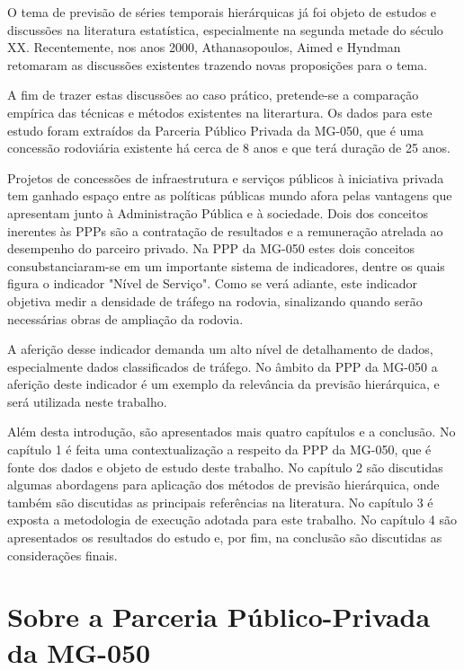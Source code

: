 \documentclass[
	12pt,				%
	openright,			%
	twoside,			%
	a4paper,			%
	english,			%
	french,				%
	spanish,			%
	brazil				%
	]{abntex2}
\begin{document}
O tema de previsão de séries temporais hierárquicas já foi objeto de estudos e discussões na literatura estatística, especialmente na segunda metade do século XX. Recentemente, nos anos 2000,  Athanasopoulos, Aimed e Hyndman retomaram as discussões existentes trazendo novas proposições para o tema. 

A fim de trazer estas discussões ao caso prático, pretende-se a comparação empírica das técnicas e métodos existentes na literartura. Os dados para este estudo foram extraídos da Parceria Público Privada da MG-050, que é uma concessão rodoviária existente há cerca de 8 anos e que terá duração de 25 anos.

Projetos de concessões de infraestrutura e serviços públicos à iniciativa privada tem ganhado espaço entre as políticas públicas mundo afora pelas vantagens que apresentam junto à Administração Pública e à sociedade. Dois dos conceitos inerentes às PPPs são a contratação de resultados e a remuneração atrelada ao desempenho do parceiro privado. Na PPP da MG-050 estes dois conceitos consubstanciaram-se em um importante sistema de indicadores, dentre os quais figura o indicador "Nível de Serviço". Como se verá adiante, este indicador objetiva medir a densidade de tráfego na rodovia, sinalizando quando serão necessárias  obras de ampliação da rodovia. 

A aferição desse indicador demanda um alto nível de detalhamento de dados, especialmente dados classificados de tráfego. No âmbito da PPP da MG-050 a aferição deste indicador é um exemplo da relevância da previsão hierárquica, e será utilizada neste trabalho.

Além desta introdução, são apresentados mais quatro capítulos e a conclusão. No capítulo 1 é feita uma contextualização a respeito da PPP da MG-050, que é fonte dos dados e objeto de estudo deste trabalho. No capítulo 2 são discutidas algumas abordagens para aplicação dos métodos de previsão hierárquica, onde também são discutidas as principais referências na literatura. No capítulo 3 é exposta a metodologia de execução adotada para este trabalho. No capítulo 4 são apresentados os resultados do estudo e, por fim, na conclusão são discutidas as considerações finais.



\chapter{Sobre a Parceria Público-Privada da MG-050}
\end{document}
